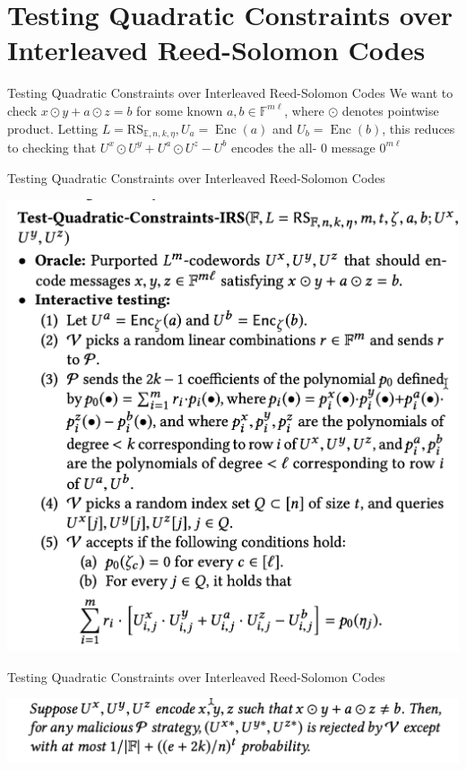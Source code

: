 \documentclass{beamer}
\begin{document}
\section{Testing Quadratic Constraints over
	Interleaved Reed-Solomon Codes}


\begin{frame}{Testing Quadratic Constraints over
		Interleaved Reed-Solomon Codes}
We want to check $x \odot y+a \odot z=b$ for some known $a, b \in \mathbb{F}^{m \ell}$, where $\odot$ denotes pointwise product. Letting $L=\mathrm{RS}_{\mathbb{E}, n, k, \eta}, U_{a}=\operatorname{Enc}(a)$ and $U_{b}=\operatorname{Enc}(b)$, this reduces to checking that $U^{x} \odot U^{y}+U^{a} \odot U^{z}-U^{b}$ encodes the all- 0 message $0^{m \ell}$
	
\end{frame}



\begin{frame}{Testing Quadratic Constraints over
		Interleaved Reed-Solomon Codes}
	\begin{minipage}{0.42\linewidth}
		\includegraphics[scale=0.23]{6.png}
	\end{minipage}

\end{frame}


\begin{frame}{Testing Quadratic Constraints over
		Interleaved Reed-Solomon Codes}
	\begin{minipage}{0.42\linewidth}
		\includegraphics[scale=0.42]{7.png}
	\end{minipage}
	\end{frame}
\end{document}
